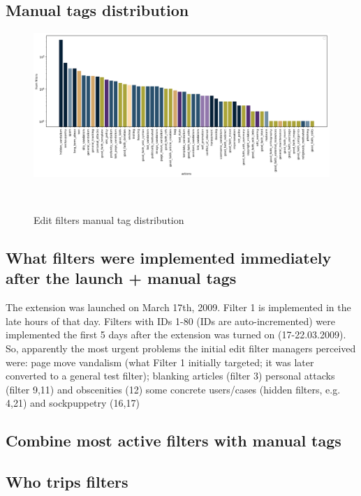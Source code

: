 \subsection{Manual tags distribution}
\begin{figure}
\centering
  \includegraphics[width=0.9\columnwidth]{pics/manual-tags-distribution.png}
  \caption{Edit filters manual tag distribution}~\label{fig:manual-tags}
\end{figure}

\subsection{What filters were implemented immediately after the launch + manual tags}
The extension was launched on March 17th, 2009.
Filter 1 is implemented in the late hours of that day.
Filters with IDs 1-80 (IDs are auto-incremented) were implemented the first 5 days after the extension was turned on (17-22.03.2009).
So, apparently the most urgent problems the initial edit filter managers perceived were:
page move vandalism (what Filter 1 initially targeted; it was later converted to a general test filter);
blanking articles (filter 3)
personal attacks (filter 9,11) and obscenities (12)
some concrete users/cases (hidden filters, e.g. 4,21) and sockpuppetry (16,17)

\subsection{Combine most active filters with manual tags}

\subsection{Who trips filters}

